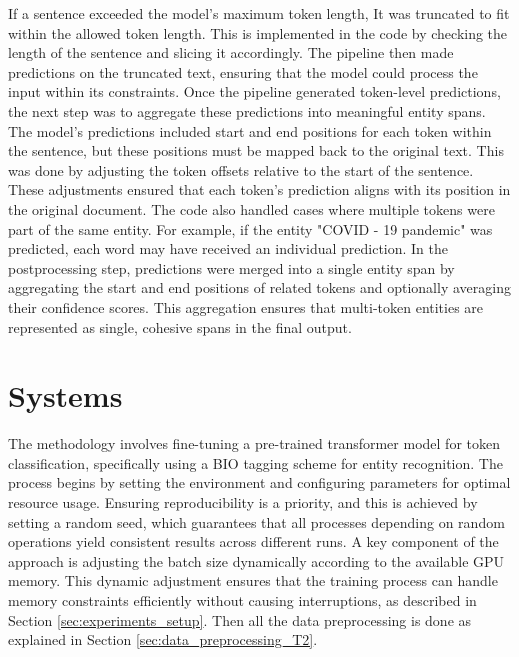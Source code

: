 \documentclass{Configuration_Files/PoliMi3i_thesis}
\begin{document}
If a sentence exceeded the model’s maximum token length, It was truncated to fit within the allowed token length. This is implemented in the code by checking the length of the sentence and slicing it accordingly. The pipeline then made predictions on the truncated text, ensuring that the model could process the input within its constraints. Once the pipeline generated token-level predictions, the next step was to aggregate these predictions into meaningful entity spans. The model's predictions included start and end positions for each token within the sentence, but these positions must be mapped back to the original text. This was done by adjusting the token offsets relative to the start of the sentence. These adjustments ensured that each token’s prediction aligns with its position in the original document. The code also handled cases where multiple tokens were part of the same entity. For example, if the entity "COVID - 19 pandemic" was predicted, each word may have received an individual prediction. In the postprocessing step, predictions were merged into a single entity span by aggregating the start and end positions of related tokens and optionally averaging their confidence scores. This aggregation ensures that multi-token entities are represented as single, cohesive spans in the final output.

\section{Systems} \label{sec:system_T2}
The methodology involves fine-tuning a pre-trained transformer model for token classification, specifically using a BIO tagging scheme for entity recognition. The process begins by setting the environment and configuring parameters for optimal resource usage. Ensuring reproducibility is a priority, and this is achieved by setting a random seed, which guarantees that all processes depending on random operations yield consistent results across different runs. A key component of the approach is adjusting the batch size dynamically according to the available GPU memory. This dynamic adjustment ensures that the training process can handle memory constraints efficiently without causing interruptions, as described in Section \ref{sec:experiments_setup}. Then all the data preprocessing is done as explained in Section \ref{sec:data_preprocessing_T2}. %
\end{document}
